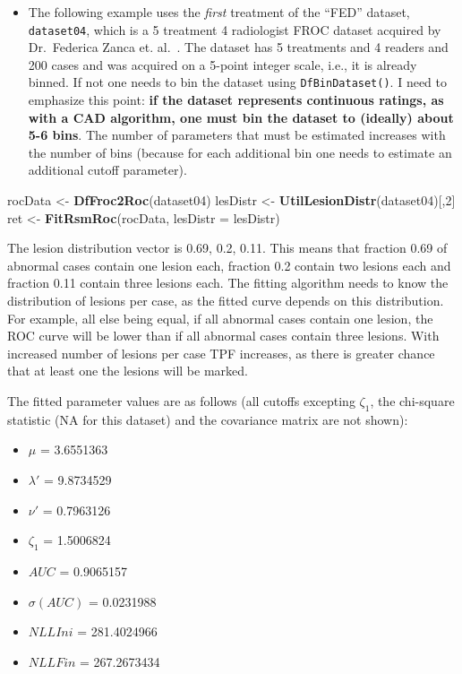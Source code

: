 \documentclass[
]{book}
\newenvironment{Shaded}{\begin{snugshade}}{\end{snugshade}}
\newcommand{\DataTypeTok}[1]{\textcolor[rgb]{0.13,0.29,0.53}{#1}}
\newcommand{\DecValTok}[1]{\textcolor[rgb]{0.00,0.00,0.81}{#1}}
\newcommand{\KeywordTok}[1]{\textcolor[rgb]{0.13,0.29,0.53}{\textbf{#1}}}
\newcommand{\NormalTok}[1]{#1}
\newcommand{\StringTok}[1]{\textcolor[rgb]{0.31,0.60,0.02}{#1}}
\providecommand{\tightlist}{%
  \setlength{\itemsep}{0pt}\setlength{\parskip}{0pt}}
\begin{document}
\begin{itemize}
\tightlist
\item
  The following example uses the \emph{first} treatment of the ``FED'' dataset, \texttt{dataset04}, which is a 5 treatment 4 radiologist FROC dataset acquired by Dr.~Federica Zanca et. al.~\citep{RN1882}. The dataset has 5 treatments and 4 readers and 200 cases and was acquired on a 5-point integer scale, i.e., it is already binned. If not one needs to bin the dataset using \texttt{DfBinDataset()}. I need to emphasize this point: \textbf{if the dataset represents continuous ratings, as with a CAD algorithm, one must bin the dataset to (ideally) about 5-6 bins}. The number of parameters that must be estimated increases with the number of bins (because for each additional bin one needs to estimate an additional cutoff parameter).
\end{itemize}

\begin{Shaded}
\begin{Highlighting}[]
\NormalTok{rocData <-}\StringTok{ }\KeywordTok{DfFroc2Roc}\NormalTok{(dataset04)}
\NormalTok{lesDistr <-}\StringTok{ }\KeywordTok{UtilLesionDistr}\NormalTok{(dataset04)[,}\DecValTok{2}\NormalTok{]}
\NormalTok{ret <-}\StringTok{ }\KeywordTok{FitRsmRoc}\NormalTok{(rocData, }\DataTypeTok{lesDistr =}\NormalTok{ lesDistr)}
\end{Highlighting}
\end{Shaded}

The lesion distribution vector is 0.69, 0.2, 0.11. This means that fraction 0.69 of abnormal cases contain one lesion each, fraction 0.2 contain two lesions each and fraction 0.11 contain three lesions each. The fitting algorithm needs to know the distribution of lesions per case, as the fitted curve depends on this distribution. For example, all else being equal, if all abnormal cases contain one lesion, the ROC curve will be lower than if all abnormal cases contain three lesions. With increased number of lesions per case TPF increases, as there is greater chance that at least one the lesions will be marked.

The fitted parameter values are as follows (all cutoffs excepting \(\zeta_1\), the chi-square statistic (NA for this dataset) and the covariance matrix are not shown):

\begin{itemize}
\tightlist
\item
  \(\mu\) = 3.6551363
\item
  \(\lambda'\) = 9.8734529
\item
  \(\nu'\) = 0.7963126
\item
  \(\zeta_1\) = 1.5006824
\item
  \(AUC\) = 0.9065157
\item
  \(\sigma (AUC)\) = 0.0231988
\item
  \(NLLIni\) = 281.4024966
\item
  \(NLLFin\) = 267.2673434
\end{itemize}
\end{document}
